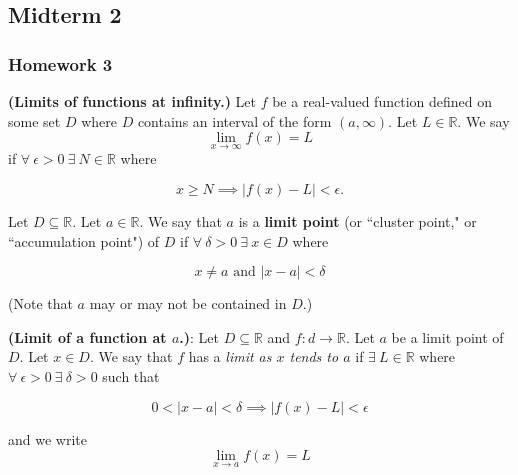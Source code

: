 \pagebreak

\subsection{Midterm 2}

\subsubsection{Homework 3}

\begin{definition} \textbf{(Limits of functions at infinity.)} Let \(f\) be a real-valued function defined on some set \(D\) where \(D\) contains an interval of the form \((a, \infty)\). Let \(L \in \mathbb{R}\). We say \[\lim_{x \to \infty} f(x) = L\]if \(\forall \ \epsilon >0 \ \exists \ N \in \mathbb{R}\) where

\[
x \geq N \implies |f(x) - L| < \epsilon.
\]

\end{definition}

\begin{definition}\label{ra.def.limit.point} Let \(D \subseteq \mathbb{R}\). Let \(a \in \mathbb{R}\). We say that \(a\) is a \textbf{limit point} (or ``cluster point," or ``accumulation point") of \(D\) if \(\forall \ \delta > 0 \ \exists \ x \in D\) where

\[
x \neq a \text{ and } |x - a| < \delta
\]

(Note that \(a\) may or may not be contained in \(D\).)

\end{definition}

\begin{definition} \textbf{(Limit of a function at \(a\).)}: Let \(D \subseteq \mathbb{R}\) and \(f:d \to \mathbb{R}\). Let \(a\) be a limit point of \(D\). Let \(x \in D\). We say that \(f\) has a \textit{limit as \(x\) tends to \(a\)} if \(\exists \ L \in \mathbb{R}\) where \(\forall \ \epsilon > 0 \ \exists \ \delta > 0 \) such that

\[
0 < |x - a| < \delta \implies |f(x) - L| < \epsilon
\]

and we write \[\lim_{x \to a} f(x) = L\]

\end{definition}

